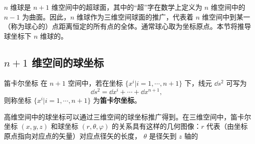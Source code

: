 
$n$ 维球是 $n+1$ 维空间中的超球面，其中的“超”字在数学上定义为 $n$ 维空间中的 $n-1$ 为曲面。因此，$n$ 维球作为三维空间球面的推广，代表着 $n$ 维空间中到某一（称为球心的）点距离恒定的所有点的全体。通常球心取为坐标原点。本节将推导球坐标下 $n$ 维球的。

\subsection{$n+1$ 维空间的球坐标}
\begin{definition}{笛卡尔坐标}
在 $n+1$ 空间中，若在坐标 $\{x^i|i=1,\cdots,n+1\}$ 下，线元 $\dd s^2$ 可写为
\begin{equation}
\dd s^2=\dd x^i+\cdots+\dd x^{n+1},~
\end{equation}
 则称坐标 $\{x^i|i=1,\cdots,n+1\}$ 为\textbf{笛卡尔坐标}。
\end{definition}

高维空间中的球坐标可以通过三维空间的球坐标推广得到。在三维空间中，笛卡尔坐标 $(x,y,z)$ 和球坐标 $(r,\theta,\varphi)$ 的关系具有这样的几何图像：$r$ 代表（由坐标原点指向对应点的矢量）对应点径矢的长度， $\theta$ 是径矢到 $z$ 轴的











